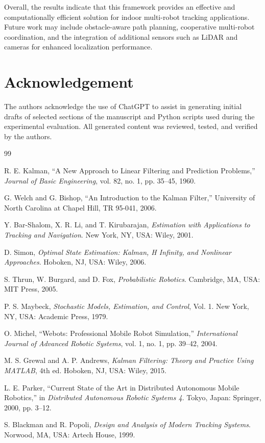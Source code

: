 \documentclass[conference]{IEEEtran}
\begin{document}
Overall, the results indicate that this framework provides an effective and computationally efficient solution for indoor multi-robot tracking applications. Future work may include obstacle-aware path planning, cooperative multi-robot coordination, and the integration of additional sensors such as LiDAR and cameras for enhanced localization performance.


\section*{Acknowledgement}

The authors acknowledge the use of ChatGPT to assist in generating initial drafts of selected sections of the manuscript and Python scripts used during the experimental evaluation. All generated content was reviewed, tested, and verified by the authors.

\begin{thebibliography}{99}

R. E. Kalman, ``A New Approach to Linear Filtering and Prediction Problems,'' \emph{Journal of Basic Engineering}, vol. 82, no. 1, pp. 35--45, 1960.

G. Welch and G. Bishop, ``An Introduction to the Kalman Filter,'' University of North Carolina at Chapel Hill, TR 95-041, 2006.

Y. Bar-Shalom, X. R. Li, and T. Kirubarajan, \emph{Estimation with Applications to Tracking and Navigation}. New York, NY, USA: Wiley, 2001.

D. Simon, \emph{Optimal State Estimation: Kalman, H Infinity, and Nonlinear Approaches}. Hoboken, NJ, USA: Wiley, 2006.

S. Thrun, W. Burgard, and D. Fox, \emph{Probabilistic Robotics}. Cambridge, MA, USA: MIT Press, 2005.

P. S. Maybeck, \emph{Stochastic Models, Estimation, and Control}, Vol. 1. New York, NY, USA: Academic Press, 1979.

O. Michel, ``Webots: Professional Mobile Robot Simulation,'' \emph{International Journal of Advanced Robotic Systems}, vol. 1, no. 1, pp. 39--42, 2004.

M. S. Grewal and A. P. Andrews, \emph{Kalman Filtering: Theory and Practice Using MATLAB}, 4th ed. Hoboken, NJ, USA: Wiley, 2015.

L. E. Parker, ``Current State of the Art in Distributed Autonomous Mobile Robotics,'' in \emph{Distributed Autonomous Robotic Systems 4}. Tokyo, Japan: Springer, 2000, pp. 3--12.

S. Blackman and R. Popoli, \emph{Design and Analysis of Modern Tracking Systems}. Norwood, MA, USA: Artech House, 1999.

\end{thebibliography}
\end{document}
